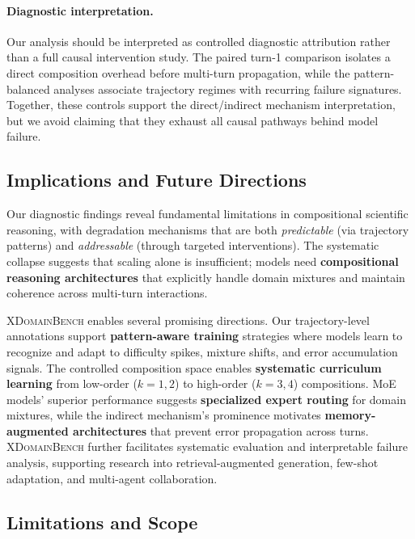 \paragraph{Diagnostic interpretation.}
Our analysis should be interpreted as controlled diagnostic attribution rather than a full causal intervention study.
The paired turn-1 comparison isolates a direct composition overhead before multi-turn propagation,
while the pattern-balanced analyses associate trajectory regimes with recurring failure signatures.
Together, these controls support the direct/indirect mechanism interpretation, 
but we avoid claiming that they exhaust all causal pathways behind model failure.

\subsection{Implications and Future Directions}
\label{sec:implications}

Our diagnostic findings reveal fundamental limitations in compositional scientific reasoning, with degradation mechanisms that are both \emph{predictable} (via trajectory patterns) and \emph{addressable} (through targeted interventions).
The systematic collapse suggests that scaling alone is insufficient; models need \textbf{compositional reasoning architectures} that explicitly handle domain mixtures and maintain coherence across multi-turn interactions.

\textsc{XDomainBench} enables several promising directions.
Our trajectory-level annotations support \textbf{pattern-aware training} strategies where models learn to recognize and adapt to difficulty spikes, mixture shifts, and error accumulation signals.
The controlled composition space enables \textbf{systematic curriculum learning} from low-order ($k=1,2$) to high-order ($k=3,4$) compositions.
MoE models' superior performance suggests \textbf{specialized expert routing} for domain mixtures, while the indirect mechanism's prominence motivates \textbf{memory-augmented architectures} that prevent error propagation across turns.
\textsc{XDomainBench} further facilitates systematic evaluation and interpretable failure analysis, supporting research into retrieval-augmented generation, few-shot adaptation, and multi-agent collaboration.

\subsection{Limitations and Scope}
\label{sec:limitations_scope}

